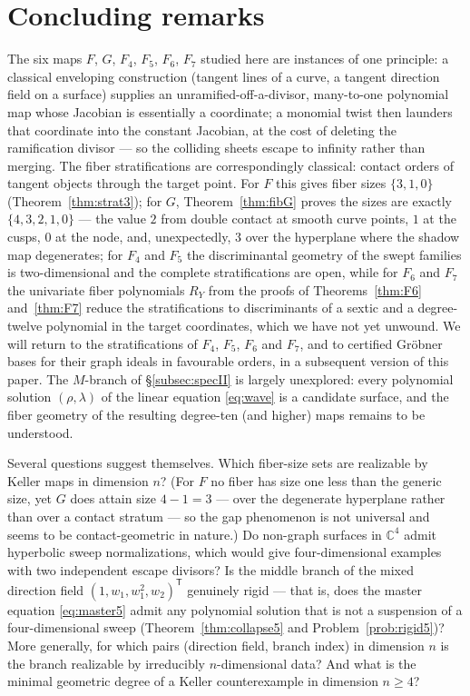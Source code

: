 \documentclass[11pt]{article}
\theoremstyle{plain}
\theoremstyle{definition}
\theoremstyle{remark}
\newcommand{\C}{\mathbb{C}}
\begin{document}
\section{Concluding remarks}\label{sec:conclusion}

The six maps $F$, $G$, $F_4$, $F_5$, $F_6$, $F_7$ studied here are instances of one principle: a
classical enveloping construction (tangent lines of a curve, a tangent direction
field on a surface) supplies an unramified-off-a-divisor, many-to-one polynomial
map whose Jacobian is essentially a coordinate; a monomial twist then launders
that coordinate into the constant Jacobian, at the cost of deleting the
ramification divisor --- so the colliding sheets escape to infinity rather than
merging. The fiber stratifications are correspondingly classical: contact orders
of tangent objects through the target point. For $F$ this gives fiber sizes
$\{3,1,0\}$ (Theorem~\ref{thm:strat3}); for $G$, Theorem~\ref{thm:fibG} proves
the sizes are exactly $\{4,3,2,1,0\}$ --- the value $2$ from double contact at
smooth curve points, $1$ at the cusps, $0$ at the node, and, unexpectedly, $3$
over the hyperplane where the shadow map degenerates; for $F_4$ and $F_5$ the
discriminantal geometry of the swept families is two-dimensional and the
complete stratifications are open, while for $F_6$ and $F_7$ the univariate
fiber polynomials $R_Y$ from the proofs of Theorems~\ref{thm:F6}
and~\ref{thm:F7} reduce the
stratifications to discriminants of a sextic and a degree-twelve polynomial in
the target coordinates, which we have not yet unwound. We will
return to the stratifications of $F_4$, $F_5$, $F_6$ and $F_7$, and to certified
Gr\"obner bases for their graph ideals in favourable orders, in a subsequent
version of this paper. The $M$-branch of \S\ref{subsec:specII} is largely
unexplored: every polynomial solution $(\rho,\lambda)$ of the linear equation
\eqref{eq:wave} is a candidate surface, and the fiber geometry of the resulting
degree-ten (and higher) maps remains to be understood.

Several questions suggest themselves. Which fiber-size sets are realizable by
Keller maps in dimension $n$? (For $F$ no fiber has size one less than the
generic size, yet $G$ does attain size $4-1=3$ --- over the degenerate hyperplane
rather than over a contact stratum --- so the gap phenomenon is not universal and
seems to be contact-geometric in nature.) Do
non-graph surfaces in $\C^4$ admit hyperbolic sweep normalizations, which would
give four-dimensional examples with two independent escape divisors? Is the
middle branch of the mixed direction field $(1,w_1,w_1^2,w_2)^{\mathsf T}$ genuinely
rigid --- that is, does the master equation \eqref{eq:master5} admit any
polynomial solution that is not a suspension of a four-dimensional sweep
(Theorem~\ref{thm:collapse5} and Problem~\ref{prob:rigid5})? More generally, for
which pairs (direction field, branch index) in dimension $n$ is the branch
realizable by irreducibly $n$-dimensional data? And what is
the minimal geometric degree of a Keller counterexample in dimension $n\ge4$?
\end{document}
